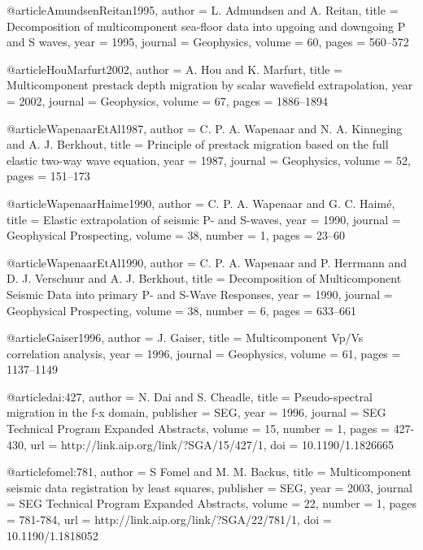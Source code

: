 {@article{AmundsenReitan1995,
  author =	 {L. Admundsen and A. Reitan},
  title =	 {Decomposition of multicomponent sea-floor data into
                  upgoing and downgoing {P} and {S} waves},
  year =	 1995,
  journal =	 {Geophysics},
  volume =	 60,
  pages =	 {560--572}
}

@article{HouMarfurt2002,
  author =	 {A. Hou and K. Marfurt},
  title =	 {Multicomponent prestack depth migration by scalar
                  wavefield extrapolation},
  year =	 2002,
  journal =	 {Geophysics},
  volume =	 67,
  pages =	 {1886--1894}
}

@article{WapenaarEtAl1987,
  author =	 {C. P. A. Wapenaar and N. A. Kinneging and
                  A. J. Berkhout},
  title =	 {Principle of prestack migration based on the full
                  elastic two-way wave equation},
  year =	 1987,
  journal =	 {Geophysics},
  volume =	 52,
  pages =	 {151--173}
}

@article{WapenaarHaime1990,
  author =	 {C. P. A. Wapenaar and G. C. Haim\'{e}},
  title =	 {Elastic extrapolation of seismic {P}- and {S}-waves},
  year =	 1990,
  journal =	 {Geophysical Prospecting},
  volume =	 38,
  number =	 1,
  pages =	 {23--60}
}

@article{WapenaarEtAl1990,
  author =	 {C. P. A. Wapenaar and P. Herrmann and
                  D. J. Verschuur and A. J. Berkhout},
  title =	 {Decomposition of Multicomponent Seismic Data into
                  primary {P}- and {S}-Wave Responses},
  year =	 1990,
  journal =	 {Geophysical Prospecting},
  volume =	 38,
  number =	 6,
  pages =	 {633--661}
}

@article{Gaiser1996,
  author =	 {J. Gaiser},
  title =	 {Multicomponent {V}p/{V}s correlation analysis},
  year =	 1996,
  journal =	 {Geophysics},
  volume =	 61,
  pages =	 {1137--1149}
}

@article{dai:427,
  author =	 {N. Dai and S. Cheadle},
  title =	 {Pseudo-spectral migration in the f-x domain},
  publisher =	 {SEG},
  year =	 1996,
  journal =	 {SEG Technical Program Expanded Abstracts},
  volume =	 15,
  number =	 1,
  pages =	 {427-430},
  url =		 {http://link.aip.org/link/?SGA/15/427/1},
  doi =		 {10.1190/1.1826665}
}

@article{fomel:781,
  author =	 {S Fomel and M. M. Backus},
  title =	 {Multicomponent seismic data registration by least
                  squares},
  publisher =	 {SEG},
  year =	 2003,
  journal =	 {SEG Technical Program Expanded Abstracts},
  volume =	 22,
  number =	 1,
  pages =	 {781-784},
  url =		 {http://link.aip.org/link/?SGA/22/781/1},
  doi =		 {10.1190/1.1818052}
}

}
